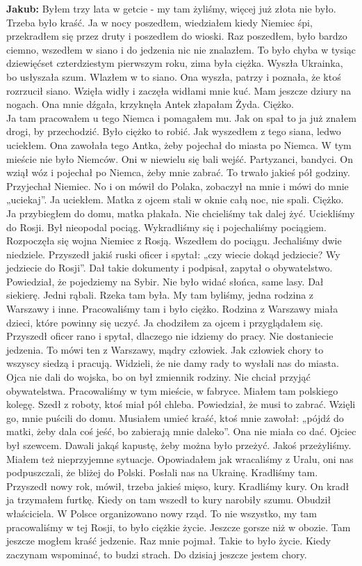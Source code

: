 \textbf{Jakub:} Byłem trzy lata w getcie - my tam żyliśmy, więcej już złota nie było. Trzeba było kraść. Ja  w nocy poszedłem, wiedziałem kiedy Niemiec śpi, przekradłem się przez druty i poszedłem do wioski. Raz poszedłem, było bardzo ciemno, wszedłem w siano i do jedzenia nic nie znalazłem. To było chyba w tysiąc dziewięćset czterdziestym pierwszym roku, zima była ciężka. Wyszła Ukrainka, bo usłyszała szum. Wlazłem w to siano. Ona wyszła, patrzy i poznała, że ktoś rozrzucił siano. Wzięła widły i zaczęła widłami mnie kuć. Mam jeszcze dziury na nogach. Ona mnie dźgała, krzyknęła Antek złapałam Żyda. Ciężko. \\
 Ja tam pracowałem u tego Niemca i pomagałem mu.  Jak on spał to ja już znałem drogi,        by przechodzić. Było ciężko to robić. Jak wyszedłem z tego siana, ledwo uciekłem. Ona zawołała tego Antka, żeby pojechał do miasta po Niemca. W tym mieście nie było Niemców. Oni w niewielu się bali wejść. Partyzanci, bandyci. On wziął wóz i pojechał po Niemca, żeby mnie zabrać. To trwało jakieś pół godziny. Przyjechał Niemiec. No i on mówił do Polaka, zobaczył na mnie i mówi do mnie „uciekaj”.    Ja uciekłem. Matka z ojcem stali w oknie całą noc, nie spali. Ciężko. Ja przybiegłem do domu, matka płakała. Nie chcieliśmy tak dalej żyć. Uciekliśmy do Rosji. Był nieopodal pociąg. Wykradliśmy się           i pojechaliśmy pociągiem. Rozpoczęła się wojna Niemiec z Rosją. Wszedłem do pociągu. Jechaliśmy dwie niedziele. Przyszedł jakiś ruski oficer i spytał: „czy wiecie dokąd jedziecie? Wy jedziecie do Rosji”. Dał takie dokumenty i podpisał, zapytał o obywatelstwo. Powiedział, że pojedziemy na Sybir. Nie było widać słońca, same lasy. Dał siekierę. Jedni rąbali. Rzeka tam była. My tam byliśmy, jedna rodzina z Warszawy i inne. Pracowaliśmy tam i było ciężko. Rodzina z Warszawy miała dzieci, które powinny się uczyć. Ja chodziłem za ojcem i przyglądałem się. Przyszedł oficer rano i spytał, dlaczego nie idziemy do pracy. Nie dostaniecie jedzenia. To mówi ten z Warszawy, mądry człowiek.    Jak człowiek chory to wszyscy siedzą i pracują. Widzieli, że nie damy rady to wysłali nas do miasta. Ojca nie dali do wojska, bo on był zmiennik rodziny. Nie chciał przyjąć obywatelstwa. Pracowaliśmy w tym mieście, w fabryce. Miałem tam polskiego kolegę. Szedł z roboty, ktoś miał pół chleba. Powiedział, że musi to zabrać. Wzięli go, mnie puścili do domu. Musiałem umieć kraść, ktoś mnie zawołał:  „pójdź do matki, żeby dala coś jeść, bo zabierają mnie daleko”. Ona nie miała co dać. Ojciec był szewcem. Dawali jakąś kapustę,  żeby można było przeżyć. Jakoś przeżyliśmy. Miałem też nieprzyjemne sytuacje. Opowiadałem jak wracaliśmy z Uralu, oni nas podpuszczali, że bliżej do Polski. Posłali nas na Ukrainę. Kradliśmy tam. Przyszedł nowy rok, mówił, trzeba jakieś mięso, kury. Kradliśmy kury. On kradł ja trzymałem furtkę. Kiedy on tam wszedł to kury narobiły szumu. Obudził właściciela. W Polsce organizowano nowy rząd. To nie wszystko, my tam pracowaliśmy w tej Rosji, to było ciężkie życie. Jeszcze gorsze niż w obozie. Tam jeszcze mogłem kraść jedzenie. Raz mnie pojmał. Takie to było życie. Kiedy zaczynam wspominać, to budzi strach. Do dzisiaj jeszcze jestem chory.\\  
